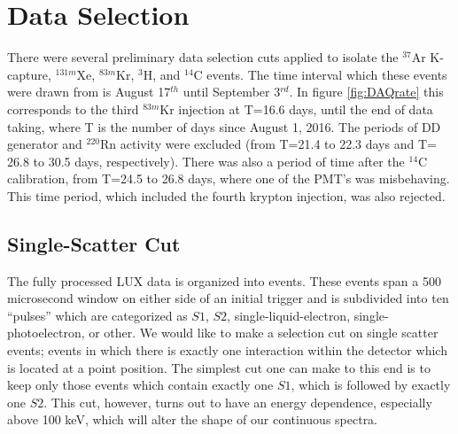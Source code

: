 {\section{Data Selection}\label{sec:cuts}
There were several preliminary data selection cuts applied to isolate the $^{37}$Ar K-capture, $^{131m}$Xe, $^{83m}$Kr, $^{3}$H, and $^{14}$C events. The time interval which these events were drawn from is  August 17$^{th}$ until September 3$^{rd}$. In figure \ref{fig:DAQrate} this corresponds to the third $^{83m}$Kr injection at T=16.6 days, until the end of data taking, where T is the number of days since August 1, 2016. The periods of DD generator and $^{220}$Rn activity were excluded (from T=21.4 to 22.3 days and T= 26.8 to 30.5 days, respectively). There was also a period of time after the $^{14}$C calibration, from T=24.5 to 26.8 days, where one of the PMT's was misbehaving. This time period, which included the fourth krypton injection, was also rejected.


\subsection{Single-Scatter Cut}\label{sec:sscut}
The fully processed LUX data is organized into events. These events span a 500 microsecond window on either side of an initial trigger and is subdivided into ten ``pulses'' which are categorized as $S1$, $S2$, single-liquid-electron, single-photoelectron, or other. We would like to make a selection cut on single scatter events; events in which there is exactly one interaction within the detector which is located at a point position. The simplest cut one can make to this end is to keep only those events which contain exactly one $S1$, which is followed by exactly one $S2$. This cut, however, turns out to have an energy dependence, especially above 100 keV, which will alter the shape of our continuous spectra. 

}
